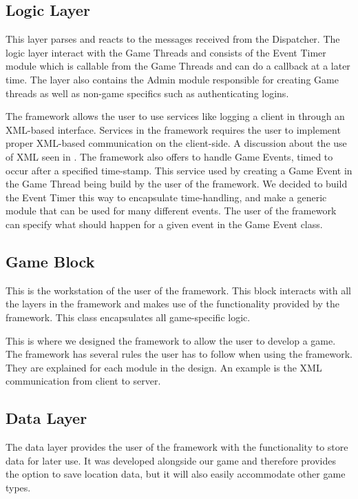 


\subsection{Logic Layer}
This layer parses and reacts to the messages received from the Dispatcher. The logic layer interact with the Game Threads and consists of the Event Timer module which is callable from the Game Threads and can do a callback at a later time. The layer also contains the Admin module responsible for creating Game threads as well as non-game specifics such as authenticating logins.

The framework allows the user to use services like logging a client in through an XML-based interface. Services in the framework requires the user to implement proper XML-based communication on the client-side. A discussion about the use of XML seen in . The framework also offers to handle Game Events, timed to occur after a specified time-stamp. This service used by creating a Game Event in the Game Thread being build by the user of the framework. We decided to build the Event Timer this way to encapsulate time-handling, and make a generic module that can be used for many different events. The user of the framework can specify what should happen for a given event in the Game Event class.




\subsection{Game Block}
This is the workstation of the user of the framework. This block interacts with all the layers in the framework and makes use of the functionality provided by the framework. This class encapsulates all game-specific logic.

This is where we designed the framework to allow the user to develop a game. The framework has several rules the user has to follow when using the framework. They are explained for each module in the design. An example is the XML communication from client to server.
 


\subsection{Data Layer}
The data layer provides the user of the framework with the functionality to store data for later use. It was developed alongside our game and therefore provides the option to save location data, but it will also easily accommodate other game types.



